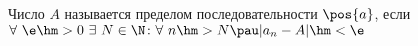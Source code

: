 
    Число $A$ называется пределом последовательности $\pos{a}$, если \\$\forall\  \e\hm>0\ \exists\  N\in\N\colon \forall\  n\hm>N\pau |a_n-A|\hm<\e$
